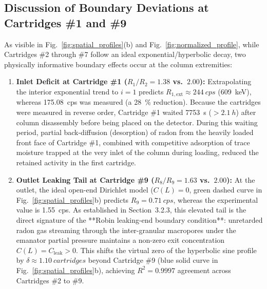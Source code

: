 \documentclass[11pt,a4paper]{article}
\begin{document}
\subsection{Discussion of Boundary Deviations at Cartridges \#1 and \#9}
As visible in Fig.~\ref{fig:spatial_profiles}(b) and Fig.~\ref{fig:normalized_profile}, while Cartridges \#2 through \#7 follow an ideal exponential/hyperbolic decay, two physically informative boundary effects occur at the column extremities:
\begin{enumerate}
    \item \textbf{Inlet Deficit at Cartridge \#1 ($R_1/R_2 = 1.38$ vs.\ $2.00$):} Extrapolating the interior exponential trend to $i=1$ predicts $R_{1,\text{ext}} \approx \SI{244}{cps}$ (\SI{609}{keV}), whereas \SI{175.08}{cps} was measured (a \SI{28}{\percent} reduction). Because the cartridges were measured in reverse order, Cartridge \#1 waited \SI{7753}{s} ($>\SI{2.1}{h}$) after column disassembly before being placed on the detector. During this waiting period, partial back-diffusion (desorption) of radon from the heavily loaded front face of Cartridge \#1, combined with competitive adsorption of trace moisture trapped at the very inlet of the column during loading, reduced the retained activity in the first cartridge.
    \item \textbf{Outlet Leaking Tail at Cartridge \#9 ($R_8/R_9 = 1.63$ vs.\ $2.00$):} At the outlet, the ideal open-end Dirichlet model ($C(L)=0$, green dashed curve in Fig.~\ref{fig:spatial_profiles}b) predicts $R_9 = \SI{0.71}{cps}$, whereas the experimental value is \SI{1.55}{cps}. As established in Section~3.2.3, this elevated tail is the direct signature of the **Robin leaking-end boundary condition**: unretarded radon gas streaming through the inter-granular macropores under the emanator partial pressure maintains a non-zero exit concentration $C(L) = C_{\text{leak}} > 0$. This shifts the virtual zero of the hyperbolic sine profile by $\delta \approx \SI{1.10}{cartridges}$ beyond Cartridge \#9 (blue solid curve in Fig.~\ref{fig:spatial_profiles}b), achieving $R^2 = 0.9997$ agreement across Cartridges \#2 to \#9.
\end{enumerate}

\end{document}
